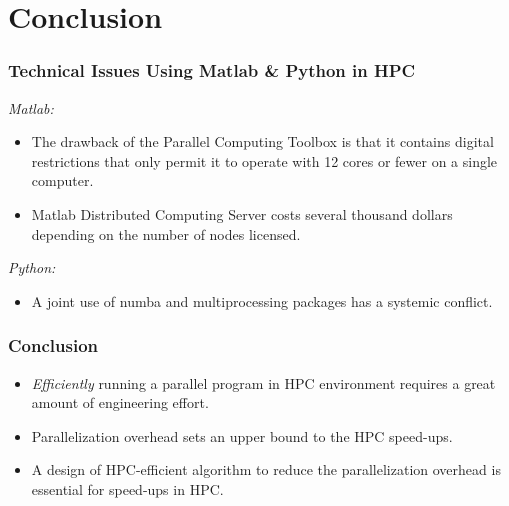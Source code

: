 \documentclass[xcolor=x11names,compress]{beamer}
\renewcommand{\(}{\begin{columns}}
\renewcommand{\)}{\end{columns}}
\newcommand{\<}[1]{\begin{column}{#1}}
\renewcommand{\>}{\end{column}}
\begin{document}
\section{Conclusion}
\begin{frame}
\frametitle{Technical Issues Using Matlab \& Python in HPC}
\textit{Matlab:}
\begin{itemize}
\item The drawback of the Parallel Computing Toolbox is that it contains digital restrictions that only permit it to operate with 12 cores or fewer on a single computer.
\item Matlab Distributed Computing Server costs several thousand dollars depending on the number of nodes licensed.
\end{itemize}
\bigskip
\textit{Python:}
\begin{itemize}
\item A joint use of numba and multiprocessing packages has a systemic conflict.
\end{itemize}
\end{frame}



\begin{frame}
\frametitle{Conclusion}
\begin{itemize}
\item \textit{Efficiently} running a parallel program in HPC environment requires a great amount of engineering effort.
\item Parallelization overhead sets an upper bound to the HPC speed-ups.
\item A design of HPC-efficient algorithm to reduce the parallelization overhead is essential for speed-ups in HPC.
\end{itemize}
\end{frame}
\end{document}
